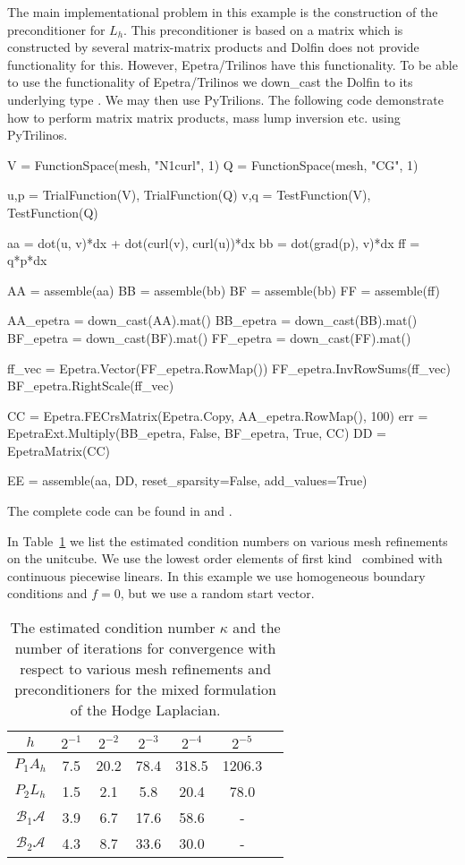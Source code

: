The main implementational problem in this example is the construction of the preconditioner
for $L_h$. This preconditioner is based on a matrix which is constructed by 
several matrix-matrix products and Dolfin does not provide functionality for
this. However, Epetra/Trilinos have this functionality. To be able 
to use the functionality of Epetra/Trilinos we down\_cast the Dolfin 
to its underlying type . We may then use PyTrilions. 
The following code demonstrate how to perform matrix matrix products, mass lump inversion  etc. using 
PyTrilinos. 
\begin{python}
V = FunctionSpace(mesh, "N1curl", 1)
Q = FunctionSpace(mesh, "CG", 1)

u,p = TrialFunction(V), TrialFunction(Q)
v,q = TestFunction(V), TestFunction(Q)

aa = dot(u, v)*dx + dot(curl(v), curl(u))*dx   
bb = dot(grad(p), v)*dx  
ff = q*p*dx  

AA = assemble(aa) 
BB = assemble(bb) 
BF = assemble(bb) 
FF = assemble(ff)

AA_epetra = down_cast(AA).mat()
BB_epetra = down_cast(BB).mat()
BF_epetra = down_cast(BF).mat()
FF_epetra = down_cast(FF).mat()

ff_vec = Epetra.Vector(FF_epetra.RowMap())
FF_epetra.InvRowSums(ff_vec)
BF_epetra.RightScale(ff_vec)

CC = Epetra.FECrsMatrix(Epetra.Copy, AA_epetra.RowMap(), 100)
err = EpetraExt.Multiply(BB_epetra, False, BF_epetra, True, CC) 
DD = EpetraMatrix(CC)

EE = assemble(aa, DD, reset_sparsity=False, add_values=True)
\end{python}
The complete code can be found in  and . 

In Table~\ref{table:hodge} we list the estimated condition numbers on various mesh refinements
on the unitcube. We use the  lowest order \nedelec{} elements of first
kind~\citep{Nedelec1980a} combined with continuous piecewise linears.
In this example we use homogeneous boundary conditions and $f=0$, but we use a random start vector. 
\begin{table}
\begin{center}
\begin{tabular}{|c||c|c|c|c|c|c|}
\hline
$h$ & $2^{-1}$ & $2^{-2}$ & $2^{-3}$ & $2^{-4}$  & $2^{-5}$ \\ \hline 
$ P_1 A_h$ & 7.5 & 20.2 & 78.4 & 318.5 & 1206.3 \\ \hline
$ P_2 L_h$ & 1.5 & 2.1  & 5.8  & 20.4 & 78.0 \\ \hline
$\mathcal{B}_1 \mathcal{A}$ & 3.9 & 6.7 & 17.6 & 58.6 & - \\ \hline
$\mathcal{B}_2 \mathcal{A}$ & 4.3 & 8.7 & 33.6 & 30.0 & - \\ \hline
\end{tabular}
\caption{The estimated condition number $\kappa$ and the number of iterations for 
  convergence with respect to various mesh refinements and preconditioners for the mixed formulation of the Hodge Laplacian.}  \label{table:hodge}
\end{center}
\end{table}



